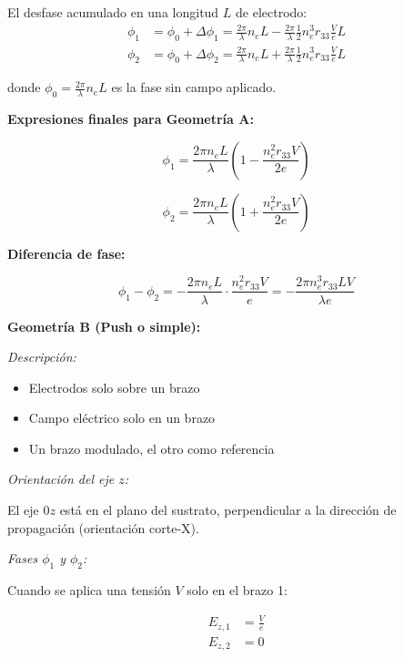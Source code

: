 \documentclass[12pt,a4paper]{article}
\begin{document}
\begin{enumerate}
El desfase acumulado en una longitud $L$ de electrodo:
\begin{align}
    \phi_1 &= \phi_0 + \Delta\phi_1 = \frac{2\pi}{\lambda} n_e L - \frac{2\pi}{\lambda} \frac{1}{2} n_e^3 r_{33} \frac{V}{e} L \\
    \phi_2 &= \phi_0 + \Delta\phi_2 = \frac{2\pi}{\lambda} n_e L + \frac{2\pi}{\lambda} \frac{1}{2} n_e^3 r_{33} \frac{V}{e} L
\end{align}

donde $\phi_0 = \frac{2\pi}{\lambda} n_e L$ es la fase sin campo aplicado.

\textbf{Expresiones finales para Geometría A:}

\begin{equation}
    \boxed{\phi_1 = \frac{2\pi n_e L}{\lambda} \left(1 - \frac{n_e^2 r_{33} V}{2e}\right)}
\end{equation}

\begin{equation}
    \boxed{\phi_2 = \frac{2\pi n_e L}{\lambda} \left(1 + \frac{n_e^2 r_{33} V}{2e}\right)}
\end{equation}

\textbf{Diferencia de fase:}

\begin{equation}
    \phi_1 - \phi_2 = -\frac{2\pi n_e L}{\lambda} \cdot \frac{n_e^2 r_{33} V}{e} = -\frac{2\pi n_e^3 r_{33} L V}{\lambda e}
\end{equation}

\textbf{Geometría B (Push o simple):}

\textit{Descripción:}
\begin{itemize}
    \item Electrodos solo sobre un brazo
    \item Campo eléctrico solo en un brazo
    \item Un brazo modulado, el otro como referencia
\end{itemize}

\textit{Orientación del eje $z$:}

El eje $0z$ está en el plano del sustrato, perpendicular a la dirección de propagación (orientación corte-X).

\textit{Fases $\phi_1$ y $\phi_2$:}

Cuando se aplica una tensión $V$ solo en el brazo 1:

\begin{align}
    E_{z,1} &= \frac{V}{e} \\
    E_{z,2} &= 0
\end{align}


\end{enumerate}
\end{document}
